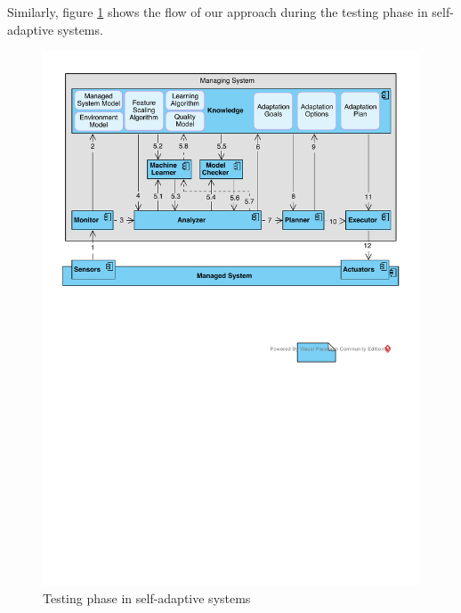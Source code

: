 \documentclass[a4paper,12pt]{article}
\begin{document}
Similarly, figure \ref{TestingView} shows the flow of our approach during the testing phase in self-adaptive systems. 
\begin{figure}[H]
	\centering
	\includegraphics[keepaspectratio, width=\linewidth]{figures/TestingView.pdf}
	\caption{Testing phase in self-adaptive systems}
	\label{TestingView}
\end{figure}
\end{document}
